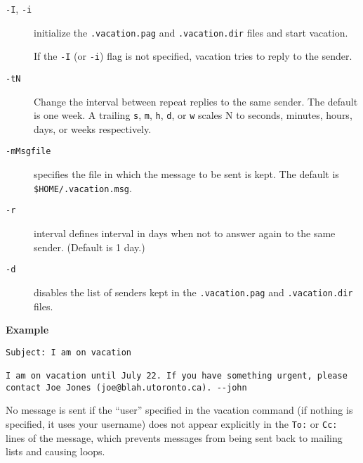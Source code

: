 \begin{description}
\item[{\tt -I}, {\tt -i}] \mbox{}

initialize the {\tt .vacation.pag} 
and {\tt .vacation.dir} files and start vacation.

If the {\tt -I} (or {\tt -i}) flag is not specified, vacation 
tries to reply to the sender.



\item[{\tt -tN}] \mbox{}

Change the interval between repeat replies to the same 
sender. The default is one week. A trailing {\tt s}, {\tt m}, 
{\tt h}, {\tt d}, or {\tt w} scales N to seconds, minutes, 
hours, days, or weeks respectively.



\item[{\tt -mMsgfile}] \mbox{}

specifies the file in which the message to be 
sent is kept. 
The default is {\tt \$HOME/.vacation.msg}.



\item[{\tt -r}] \mbox{}

interval defines interval in days when not to answer 
again to the same sender. (Default is 1 day.)



\item[{\tt -d}] \mbox{}

disables the list of senders kept in the 
{\tt .vacation.pag} and {\tt .vacation.dir} files.

\end{description}


{\bf Example}

\begin{tscreen}
\begin{verbatim}
Subject: I am on vacation

I am on vacation until July 22. If you have something urgent, please 
contact Joe Jones (joe@blah.utoronto.ca). --john
\end{verbatim}
\end{tscreen}


No message is sent if the ``user'' specified in the vacation  
command (if nothing is specified, it uses your username) does 
not appear explicitly in the {\tt To:} or {\tt Cc:} lines of the 
message, which prevents messages from being sent back to mailing lists 
and causing loops.


